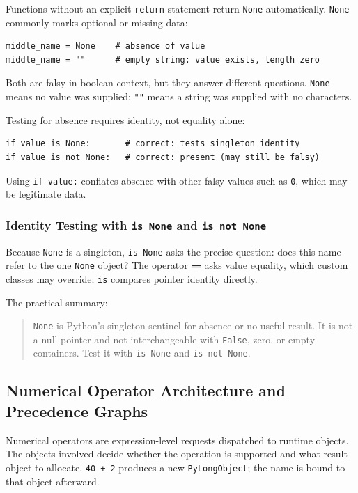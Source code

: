 \documentclass[a4paper,twoside]{report}
\begin{document}
Functions without an explicit \texttt{return} statement return \texttt{None} automatically. \texttt{None} commonly marks optional or missing data:

\begin{verbatim}
middle_name = None    # absence of value
middle_name = ""      # empty string: value exists, length zero
\end{verbatim}

Both are falsy in boolean context, but they answer different questions. \texttt{None} means no value was supplied; \texttt{""} means a string was supplied with no characters.

Testing for absence requires identity, not equality alone:

\begin{verbatim}
if value is None:       # correct: tests singleton identity
if value is not None:   # correct: present (may still be falsy)
\end{verbatim}

Using \texttt{if value:} conflates absence with other falsy values such as \texttt{0}, which may be legitimate data.

\subsubsection{Identity Testing with \texttt{is None} and \texttt{is not None}}

Because \texttt{None} is a singleton, \texttt{is None} asks the precise question: does this name refer to the one \texttt{None} object? The operator \texttt{==} asks value equality, which custom classes may override; \texttt{is} compares pointer identity directly.

The practical summary:

\begin{quote}
\texttt{None} is Python's singleton sentinel for absence or no useful result. It is not a null pointer and not interchangeable with \texttt{False}, zero, or empty containers. Test it with \texttt{is None} and \texttt{is not None}.
\end{quote}


\subsection{Numerical Operator Architecture and Precedence Graphs}

Numerical operators are expression-level requests dispatched to runtime objects. The objects involved decide whether the operation is supported and what result object to allocate. \texttt{40 + 2} produces a new \texttt{PyLongObject}; the name is bound to that object afterward.
\end{document}
